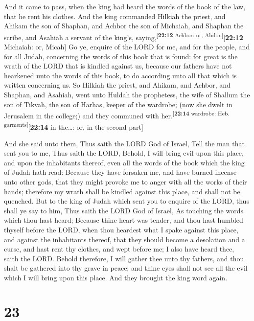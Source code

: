  And it came to pass, when the king had heard the words
of the book of the law, that he rent his clothes.  And
the king commanded Hilkiah the priest, and Ahikam the son of Shaphan,
and Achbor the son of Michaiah, and Shaphan the scribe, and Asahiah a
servant of the king's, saying,\textsuperscript{{[}\textbf{22:12} Achbor:
or, Abdon{]}}{[}\textbf{22:12} Michaiah: or, Micah{]}  Go
ye, enquire of the LORD for me, and for the people, and for all Judah,
concerning the words of this book that is found: for great is the wrath
of the LORD that is kindled against us, because our fathers have not
hearkened unto the words of this book, to do according unto all that
which is written concerning us.  So Hilkiah the priest,
and Ahikam, and Achbor, and Shaphan, and Asahiah, went unto Huldah the
prophetess, the wife of Shallum the son of Tikvah, the son of Harhas,
keeper of the wardrobe; (now she dwelt in Jerusalem in the college;) and
they communed with her.\textsuperscript{{[}\textbf{22:14} wardrobe: Heb.
garments{]}}{[}\textbf{22:14} in the\ldots: or, in the second part{]}

 And she said unto them, Thus saith the LORD God of
Israel, Tell the man that sent you to me,  Thus saith the
LORD, Behold, I will bring evil upon this place, and upon the
inhabitants thereof, even all the words of the book which the king of
Judah hath read:  Because they have forsaken me, and have
burned incense unto other gods, that they might provoke me to anger with
all the works of their hands; therefore my wrath shall be kindled
against this place, and shall not be quenched.  But to
the king of Judah which sent you to enquire of the LORD, thus shall ye
say to him, Thus saith the LORD God of Israel, As touching the words
which thou hast heard;  Because thine heart was tender,
and thou hast humbled thyself before the LORD, when thou heardest what I
spake against this place, and against the inhabitants thereof, that they
should become a desolation and a curse, and hast rent thy clothes, and
wept before me; I also have heard thee, saith the LORD. 
Behold therefore, I will gather thee unto thy fathers, and thou shalt be
gathered into thy grave in peace; and thine eyes shall not see all the
evil which I will bring upon this place. And they brought the king word
again.

\hypertarget{section-22}{%
\section{23}\label{section-22}}

